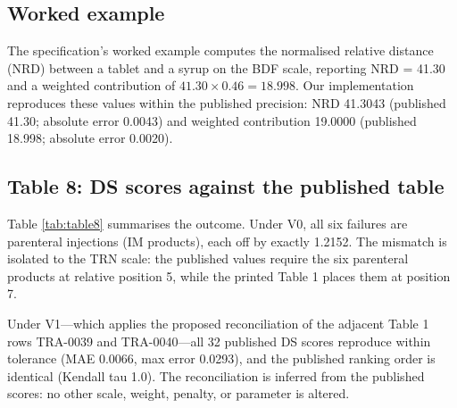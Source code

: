 \documentclass[a4paper]{elsarticle}
\begin{document}
\subsection{Worked example}
\label{sec:results-worked}

The specification's worked example computes the normalised relative distance (NRD) between a tablet and a syrup on the BDF scale, reporting NRD = 41.30 and a weighted contribution of $41.30 \times 0.46 = 18.998$. Our implementation reproduces these values within the published precision: NRD 41.3043 (published 41.30; absolute error 0.0043) and weighted contribution 19.0000 (published 18.998; absolute error 0.0020).

\subsection{Table 8: DS scores against the published table}
\label{sec:results-table8}

\begin{table}[htbp]
\centering\small
\caption{Reproduction of the 32 published Table 8 DS scores under two scoring modes. Match tolerance: 0.05 (published one-decimal rounding).}
\label{tab:table8}
\end{table}

Table \ref{tab:table8} summarises the outcome. Under V0, all six failures are parenteral injections (IM products), each off by exactly 1.2152. The mismatch is isolated to the TRN scale: the published values require the six parenteral products at relative position 5, while the printed Table 1 places them at position 7.

Under V1---which applies the proposed reconciliation of the adjacent Table 1 rows TRA-0039 and TRA-0040---all 32 published DS scores reproduce within tolerance (MAE 0.0066, max error 0.0293), and the published ranking order is identical (Kendall tau 1.0). The reconciliation is inferred from the published scores: no other scale, weight, penalty, or parameter is altered.
\end{document}
